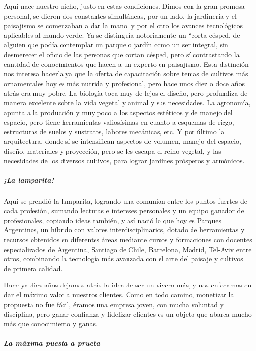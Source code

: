 \documentclass[
]{article}
\begin{document}
Aquí nace nuestro nicho, justo en estas condiciones. Dimos con la gran
promesa personal, se dieron dos constantes simultáneas, por un lado, la
jardinería y el paisajismo se comenzaban a dar la mano, y por el otro
los avances tecnológicos aplicables al mundo verde. Ya se distinguía
notoriamente un ``corta césped, de alguien que podía contemplar un
parque o jardín como un ser integral, sin desmerecer el oficio de las
personas que cortan césped, pero sí contrastando la cantidad de
conocimientos que hacen a un experto en paisajismo. Esta distinción nos
interesa hacerla ya que la oferta de capacitación sobre temas de
cultivos más ornamentales hoy es más nutrida y profesional, pero hace
unos diez o doce años atrás era muy pobre. La biología toca muy de lejos
el diseño, pero profundiza de manera excelente sobre la vida vegetal y
animal y sus necesidades. La agronomía, apunta a la producción y muy
poco a los aspectos estéticos y de manejo del espacio, pero tiene
herramientas valiosísimas en cuanto a esquemas de riego, estructuras de
suelos y sustratos, labores mecánicas, etc. Y por último la
arquitectura, donde sí se intensifican aspectos de volumen, manejo del
espacio, diseño, materiales y proyección, pero se les escapa el reino
vegetal, y las necesidades de los diversos cultivos, para lograr
jardines prósperos y armónicos.

\hypertarget{la-lamparita}{%
\subparagraph{¡La lamparita!}\label{la-lamparita}}

Aquí se prendió la lamparita, logrando una comunión entre los puntos
fuertes de cada profesión, sumando lecturas e intereses personales y un
equipo ganador de profesionales, copiando ideas también, y así nació lo
que hoy es Parques Argentinos, un híbrido con valores
interdisciplinarios, dotado de herramientas y recursos obtenidos en
diferentes áreas mediante cursos y formaciones con docentes
especializados de Argentina, Santiago de Chile, Barcelona, Madrid,
Tel-Aviv entre otros, combinando la tecnología más avanzada con el arte
del paisaje y cultivos de primera calidad.

Hace ya diez años dejamos atrás la idea de ser un vivero más, y nos
enfocamos en dar el máximo valor a nuestros clientes. Como en todo
camino, monetizar la propuesta no fue fácil, éramos una empresa joven,
con mucha voluntad y disciplina, pero ganar confianza y fidelizar
clientes es un objeto que abarca mucho más que conocimiento y ganas.

\hypertarget{la-muxe1xima-puesta-a-prueba}{%
\subparagraph{La máxima puesta a
prueba}\label{la-muxe1xima-puesta-a-prueba}}
\end{document}
